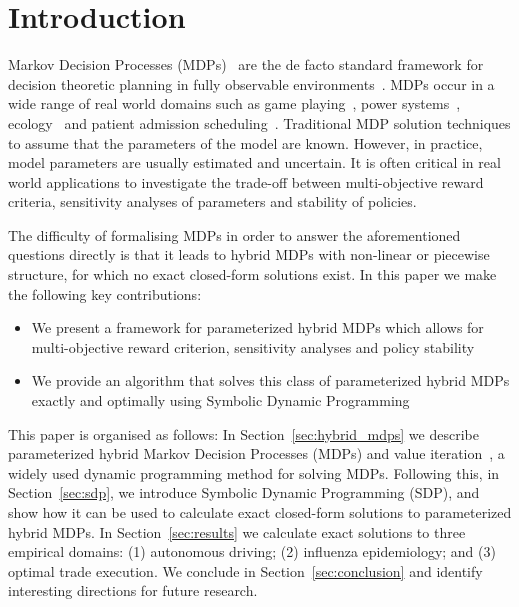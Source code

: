 \section{Introduction}
\label{sec:introduction}

Markov Decision Processes (MDPs)~\parencite{Howard_MIT_1960} are the de facto standard framework for decision theoretic
planning in fully observable environments~\parencite{Boutilier_JAIR_1999}. MDPs occur in a wide range of real world domains such as game playing~\parencite{Szita_RL_2012}, power systems~\parencite{Reddy_IJCAI_2011}, ecology~\parencite{Williams_EM_2009} and patient admission scheduling~\parencite{Zhu_AIM_2014}. Traditional MDP solution techniques to assume that the parameters of the model are known. However, in practice, model parameters are usually estimated and uncertain. It is often critical in real world applications to investigate the trade-off between multi-objective reward criteria, sensitivity analyses of parameters and stability of policies.

The difficulty of formalising MDPs in order to answer the aforementioned questions directly is that it leads to hybrid MDPs with non-linear or piecewise structure, for which no exact closed-form solutions exist. In this paper we make the following key contributions:
\begin{itemize}
    \item We present a framework for parameterized hybrid MDPs which allows for multi-objective reward criterion, sensitivity analyses and policy stability \\
    \item We provide an algorithm that solves this class of parameterized hybrid MDPs exactly and optimally using Symbolic Dynamic Programming~\parencite{Boutilier_IJCAI_2001}\\
\end{itemize}

This paper is organised as follows: In Section~\ref{sec:hybrid_mdps} we describe parameterized hybrid Markov Decision Processes (MDPs) and value iteration~\parencite{Bellman_PU_1957}, a widely used dynamic programming method for solving MDPs. Following this, in Section~\ref{sec:sdp}, we introduce Symbolic Dynamic Programming (SDP), and show how it can be used to calculate exact closed-form solutions to parameterized hybrid MDPs. In Section~\ref{sec:results} we calculate exact solutions to three empirical domains: (1) autonomous driving; (2) influenza epidemiology; and (3) optimal trade execution. We conclude in Section~\ref{sec:conclusion} and identify interesting directions for future research.

